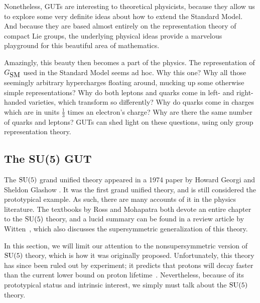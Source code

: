 \documentclass{article}
\newcommand{\SU}{{\rm SU}}    %
\newcommand{\third}{\frac{1}{3}} %
\newcommand{\GSM}{{G_{\mbox{\rm SM}}}}  %
\begin{document}
Nonetheless, GUTs are interesting to theoretical physicists, because
they allow us to explore some very definite ideas about how to extend
the Standard Model. And because they are based almost entirely on the
representation theory of compact Lie groups, the underlying physical
ideas provide a marvelous playground for this beautiful area of
mathematics.

Amazingly, this beauty then becomes a part of the physics.  The
representation of $\GSM$ used in the Standard Model seems ad hoc.  Why
this one?  Why all those seemingly arbitrary hypercharges floating
around, mucking up some otherwise simple representations? Why do both
leptons and quarks come in left- and right-handed varieties, which
transform so differently?  Why do quarks come in charges which are in
units $\third$ times an electron's charge? Why are there the same
number of quarks and leptons?  GUTs can shed light on these questions,
using only group representation theory.

\subsection{The {\rm{SU(5)}} GUT} \label{sec:su(5)}

The $\SU(5)$ grand unified theory appeared in a 1974 paper by Howard
Georgi and Sheldon Glashow \cite{GeorgiGlashow:su(5)}. It was the
first grand unified theory, and is still considered the prototypical
example.  As such, there are many accounts of it in the physics
literature.  The textbooks by Ross \cite{ross:gut} and Mohapatra
\cite{mohapatra:us} both devote an entire chapter to the $\SU(5)$
theory, and a lucid summary can be found in a review article by
Witten~\cite{witten:grandunification}, which also
discusses the supersymmetric generalization of this theory.

In this section, we will limit our attention to the nonsupersymmetric version
of $\SU(5)$ theory, which is how it was originally proposed. Unfortunately,
this theory has since been ruled out by experiment; it predicts that protons
will decay faster than the current lower bound on proton
lifetime~\cite{pati:decay}.  Nevertheless, because of its prototypical
status and intrinsic interest, we simply must talk about the $\SU(5)$ theory.
\end{document}
